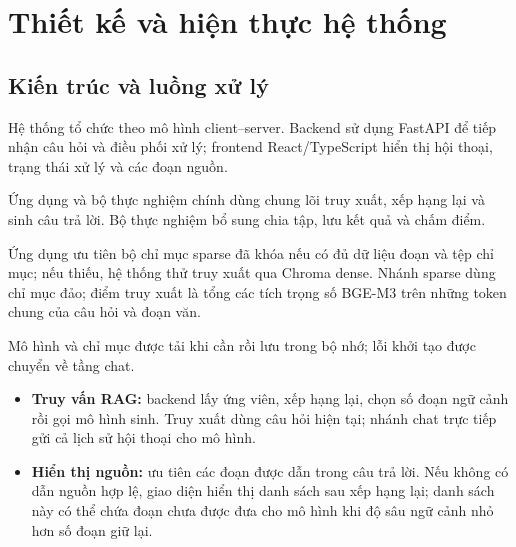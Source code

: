 \section{Thiết kế và hiện thực hệ thống}
\subsection{Kiến trúc và luồng xử lý}
Hệ thống tổ chức theo mô hình client--server. Backend sử dụng FastAPI để tiếp nhận câu hỏi và điều phối xử lý; frontend React/TypeScript hiển thị hội thoại, trạng thái xử lý và các đoạn nguồn.
\par

\par
Ứng dụng và bộ thực nghiệm chính dùng chung lõi truy xuất, xếp hạng lại và sinh câu trả lời. Bộ thực nghiệm bổ sung chia tập, lưu kết quả và chấm điểm.

Ứng dụng ưu tiên bộ chỉ mục sparse đã khóa nếu có đủ dữ liệu đoạn và tệp chỉ mục; nếu thiếu, hệ thống thử truy xuất qua Chroma dense. Nhánh sparse dùng chỉ mục đảo; điểm truy xuất là tổng các tích trọng số BGE-M3 trên những token chung của câu hỏi và đoạn văn.

Mô hình và chỉ mục được tải khi cần rồi lưu trong bộ nhớ; lỗi khởi tạo được chuyển về tầng chat.

\begin{itemize}
\item \textbf{Truy vấn RAG:} backend lấy ứng viên, xếp hạng lại, chọn số đoạn ngữ cảnh rồi gọi mô hình sinh. Truy xuất dùng câu hỏi hiện tại; nhánh chat trực tiếp gửi cả lịch sử hội thoại cho mô hình.
\item \textbf{Hiển thị nguồn:} ưu tiên các đoạn được dẫn trong câu trả lời. Nếu không có dẫn nguồn hợp lệ, giao diện hiển thị danh sách sau xếp hạng lại; danh sách này có thể chứa đoạn chưa được đưa cho mô hình khi độ sâu ngữ cảnh nhỏ hơn số đoạn giữ lại.
\end{itemize}
\par

\par
